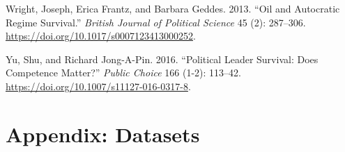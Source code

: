 \documentclass[
  12pt,
]{report}
\newlength{\cslhangindent}
\newenvironment{CSLReferences}[2] %
 {\begin{list}{}{%
  \setlength{\itemindent}{0pt}
  \setlength{\leftmargin}{0pt}
  \setlength{\parsep}{0pt}
  \ifodd #1
   \setlength{\leftmargin}{\cslhangindent}
   \setlength{\itemindent}{-1\cslhangindent}
  \fi
  \setlength{\itemsep}{#2\baselineskip}}}
 {\end{list}}
\begin{document}
\begin{CSLReferences}{1}{0}
Wright, Joseph, Erica Frantz, and Barbara Geddes. 2013. {``Oil and
Autocratic Regime Survival.''} \emph{British Journal of Political
Science} 45 (2): 287--306.
\url{https://doi.org/10.1017/s0007123413000252}.

Yu, Shu, and Richard Jong-A-Pin. 2016. {``Political Leader Survival:
Does Competence Matter?''} \emph{Public Choice} 166 (1-2): 113--42.
\url{https://doi.org/10.1007/s11127-016-0317-8}.

\end{CSLReferences}

\chapter*{\texorpdfstring{Appendix\textbf{:
Datasets}}{Appendix: Datasets}}\label{appendix-datasets}
\end{document}
